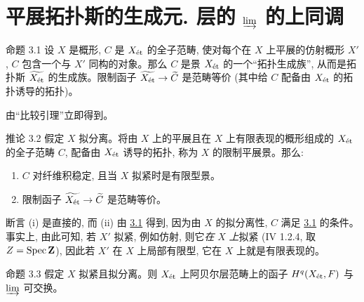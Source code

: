 
\section{平展拓扑斯的生成元. 层的 $\protect\varinjlim$ 的上同调}

\begin{enonce*}{命题 3.1}
设 $X$ 是概形, $C$ 是 $X_{\text{\rm ét}}$ 的全子范畴, 使对每个在 $X$ 上平展的仿射概形 $X'$, $C$ 包含一个与 $X'$ 同构的对象。那么 $C$ 是景 $X_{\text{\rm ét}}$ 的一个“拓扑生成族”, 从而是拓扑斯 $\widetilde{X_{\text{\rm ét}}}$ 的生成族。限制函子 $\widetilde{X_{\text{\rm ét}}}\to\widetilde{C}$ 是范畴等价 (其中给 $C$ 配备由 $X_{\text{\rm ét}}$ 的拓扑诱导的拓扑)。
\end{enonce*}

由“比较引理”立即得到。\pageoriginale

\begin{enonce*}{推论 3.2}
假定 $X$ 拟分离。将由 $X$ 上的平展且在 $X$ 上有限表现的概形组成的 $X_{\text{\rm ét}}$ 的全子范畴 $C$, 配备由 $X_{\text{\rm ét}}$ 诱导的拓扑, 称为 $X$ 的限制平展景。那么:
\begin{enumerate}
\renewcommand{\theenumi}{\roman{enumi}}
\renewcommand{\labelenumi}{(\theenumi)}
\item $C$ 对纤维积稳定, 且当 $X$ 拟紧时是有限型景。

\item 限制函子 $\widetilde{X_{\text{\rm ét}}}\to\widetilde{C}$ 是范畴等价。
\end{enumerate}
\end{enonce*}

断言 (i) 是直接的, 而 (ii) 由 \hyperref[VII.prop3.1]{3.1} 得到, 因为由 $X$ 的拟分离性, $C$ 满足 \hyperref[VII.prop3.1]{3.1} 的条件。事实上, 由此可知, 若 $X'$ 拟紧, 例如仿射, 则它\emph{在} $X$ \emph{上}拟紧 (\EGA IV 1.2.4, 取 $Z=\operatorname{Spec}\mathbf{Z}$), 因此若 $X'$ 在 $X$ 上局部有限型, 它在 $X$ 上就是有限表现的。

\begin{enonce*}{命题 3.3}
假定 $X$ 拟紧且拟分离。则 $X_{\text{\rm ét}}$ 上阿贝尔层范畴上的函子 $H^q(X_{\text{\rm ét}},F)$ 与 $\varinjlim$ 可交换。
\end{enonce*}

